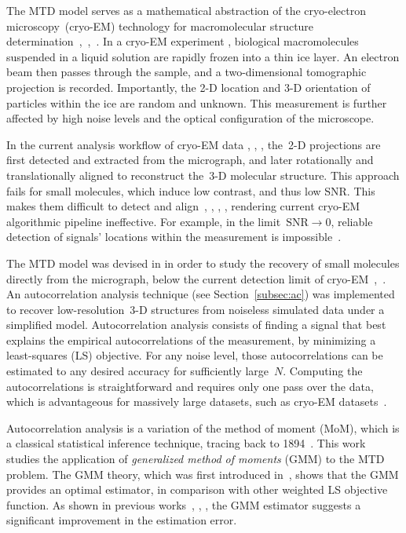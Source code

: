 \documentclass{article}
\begin{document}
The MTD model serves as a mathematical abstraction of the cryo-electron microscopy~(\mbox{cryo-EM}) technology for macromolecular structure determination~\cite{henderson1995potential},~\cite{nogales2016development},~\cite{bai2015cryo}. In a \mbox{cryo-EM} experiment \cite{frank2006three}, biological macromolecules suspended in a liquid solution are rapidly frozen into a thin ice layer. An electron beam then passes through the sample, and a two-dimensional tomographic projection is recorded. Importantly, the \mbox{2-D} location and \mbox{3-D} orientation of particles within the ice are random and unknown. This measurement is further affected by high noise levels and the optical configuration of the microscope.

In the current analysis workflow of \mbox{cryo-EM} data \cite{bendory2020single}, \cite{scheres2012relion}, \cite{punjani2017cryosparc}, the~\mbox{2-D} projections are first detected and extracted from the micrograph, and later rotationally and translationally aligned to reconstruct the~\mbox{3-D} molecular structure. This approach fails for small molecules, which induce low contrast, and thus low SNR. This makes them difficult to detect and align~\cite{bendory2018toward}, \cite{henderson1995potential}, \cite{bendory2020single}, \cite{aguerrebere2016fundamental}, rendering current \mbox{cryo-EM} algorithmic pipeline ineffective. For example, in the limit~\mbox{$\text{SNR} \rightarrow 0$}, reliable detection of signals' locations within the measurement is impossible~\cite[Proposition~3.1]{bendory2018toward}.

The MTD model was devised in \cite{bendory2018toward} in order to study the recovery of small molecules directly from the micrograph, below the current detection limit of \mbox{cryo-EM}~\cite{henderson1995potential},~\cite{d2021current}. An autocorrelation analysis technique (see Section~\ref{subsec:ac}) was implemented to recover \mbox{low-resolution}~\mbox{3-D} structures from noiseless simulated data under a simplified model. Autocorrelation analysis consists of finding a signal that best explains the empirical autocorrelations of the measurement,  by minimizing a {least-squares} (LS) objective. For any noise level, those autocorrelations can be estimated to any desired accuracy for sufficiently large~$N$. Computing the autocorrelations is straightforward and requires only one pass over the data, which is advantageous for massively large datasets, such as \mbox{cryo-EM} datasets~\cite{bendory2020single}.

Autocorrelation analysis is a variation of the method of moment (MoM), which is a classical statistical inference technique, tracing back to 1894~\cite{pearson1894contributions}. This work studies the application of \textit{generalized method of moments} (GMM) to the MTD problem. The GMM theory, which was first introduced in~\cite{Hansen1982}, shows that the GMM provides an optimal estimator, in comparison with other weighted LS objective function. As shown in previous works~\cite{abas2021generalized}, \cite{fan2018optimal}, \cite{roodman2009xtabond2}, the GMM estimator suggests a significant improvement in the estimation error.
\end{document}

